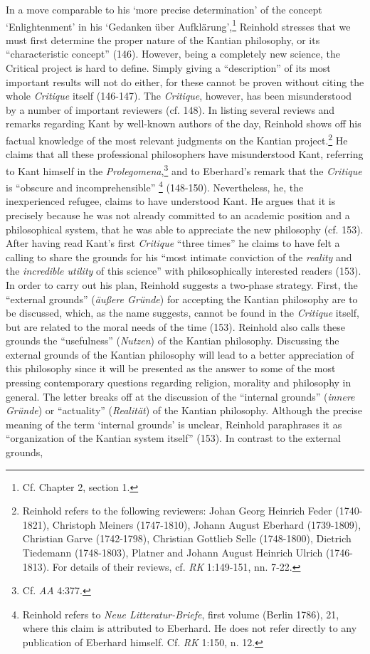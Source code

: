  In a move comparable to his `more precise determination' of the concept `Enlightenment' in his `Gedanken \"{u}ber Aufkl\"{a}rung',\footnote{ Cf. Chapter 2, section 1. } Reinhold stresses that we must first determine the proper nature of the Kantian philosophy, or its ``characteristic concept'' (146). However, being a completely new science, the Critical project is hard to define. Simply giving a ``description'' of its most important results will not do either, for these cannot be proven without citing the whole \textit{Critique} itself (146{-}147). The \textit{Critique}, however, has been misunderstood by a number of important reviewers (cf. 148). In listing several reviews and remarks regarding Kant by well{-}known authors of the day, Reinhold shows off his factual knowledge of the most relevant judgments on the Kantian project.\footnote{ Reinhold refers to the following reviewers: Johan Georg Heinrich Feder (1740{-}1821), Christoph Meiners (1747{-}1810), Johann August Eberhard (1739{-}1809), Christian Garve (1742{-}1798), Christian Gottlieb Selle (1748{-}1800), Dietrich Tiedemann (1748{-}1803), Platner and Johann August Heinrich Ulrich (1746{-}1813). For details of their reviews, cf. \textit{RK} 1:149{-}151, nn. 7{-}22. } He claims that all these professional philosophers have misunderstood Kant, referring to Kant himself in the \textit{Prolegomena},\footnote{ Cf. \textit{AA} 4:377.} and to Eberhard's remark that the \textit{Critique }is ``obscure and incomprehensible'' \footnote{ Reinhold refers to \textit{Neue Litteratur{-}Briefe}, first volume (Berlin 1786), 21, where this claim is attributed to Eberhard. He does not refer directly to any publication of Eberhard himself. Cf. \textit{RK} 1:150, n. 12. } (148{-}150). Nevertheless, he, the inexperienced refugee, claims to have understood Kant. He argues that it is precisely because he was not already committed to an academic position and a philosophical system, that he was able to appreciate the new philosophy (cf. 153). After having read Kant's first \textit{Critique} ``three times'' he claims to have felt a calling to share the grounds for his ``most intimate conviction of the \textit{reality }and the \textit{incredible utility} of this science'' with philosophically interested readers (153). In order to carry out his plan, Reinhold suggests a two{-}phase strategy. First, the ``external grounds'' (\textit{\"{a}u\ss{}ere Gr\"{u}nde}) for accepting the Kantian philosophy are to be discussed, which, as the name suggests, cannot be found in the \textit{Critique }itself, but are related to the moral needs of the time (153). Reinhold also calls these grounds the ``usefulness'' (\textit{Nutzen}) of the Kantian philosophy. Discussing the external grounds of the Kantian philosophy will lead to a better appreciation of this philosophy since it will be presented as the answer to some of the most pressing contemporary questions regarding religion, morality and philosophy in general. The letter breaks off at the discussion of the ``internal grounds'' (\textit{innere Gr\"{u}nde}) or ``actuality'' (\textit{Realit\"{a}t}) of the Kantian philosophy. Although the precise meaning of the term `internal grounds' is unclear, Reinhold paraphrases it as ``organization of the Kantian system itself'' (153). In contrast to the external grounds, 
